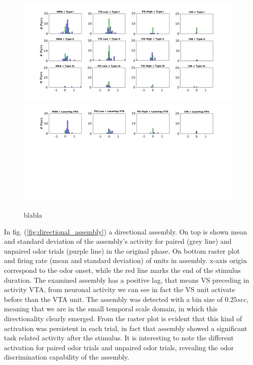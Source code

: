 \begin{figure}[H]
\centering
\includegraphics[scale=0.4]{figures/Type_oriz.png}
\includegraphics[scale=0.4]{figures/OnlyLaserOriz.png}
\caption{blabla}
\label{fig:LagInSecAll}
\end{figure}
In fig. (\ref{fig:directional_assembly}) a directional assembly. On top is shown mean and standard deviation of the assembly's activity for paired (grey line) and unpaired odor trials (purple line) in the original phase. On bottom raster plot and firing rate (mean and standard deviation) of units in assembly. x-axis origin correspond to the odor onset, while the red line marks the end of the stimulus duration. The examined assembly has a positive lag, that means VS preceding in activity VTA, from neuronal activity we can see in fact the VS unit activate before than the VTA unit. The assembly was detected with a bin size of $0.25 sec$, meaning that we are in the small temporal scale domain, in which this directionality clearly emerged. From the raster plot is evident that this kind of activation was persistent in each trial, in fact that assembly showed a significant task related activity after the stimulus. It is interesting to note the different activation for paired odor trials and unpaired odor trials, revealing the odor discrimination capability of the assembly. 
